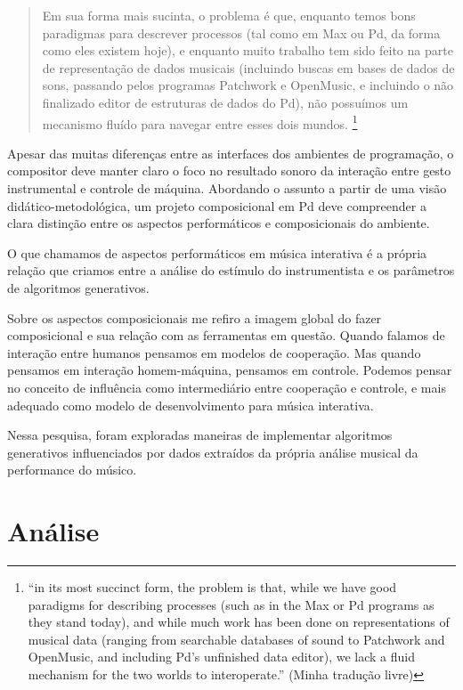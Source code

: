 \documentclass[draft]{ppgmus}
\begin{document}
\begin{quote}
Em sua forma mais sucinta, o problema é que, enquanto temos bons
paradigmas para descrever processos (tal como em Max ou Pd, da forma como
eles existem hoje), e enquanto muito trabalho tem sido feito na parte 
de representação de dados musicais (incluindo buscas em bases de dados
de sons, passando pelos programas Patchwork e OpenMusic, e incluindo
o não finalizado editor de estruturas de dados do Pd), não possuímos
um mecanismo fluído para navegar entre esses dois mundos. \cite{puckette04:divide}
  \footnote{``in its most succinct form, the problem is that, while we have good
  paradigms for describing processes (such as in the Max or Pd
  programs as they stand today), and while much work has been done on
  representations of musical data (ranging from searchable databases
  of sound to Patchwork and OpenMusic, and including Pd's unfinished
  data editor), we lack a fluid mechanism for the two worlds to
  interoperate.'' (Minha tradução livre)} 
\end{quote}

Apesar das muitas diferenças entre
as interfaces dos ambientes de programação, 
o compositor deve manter claro o foco no resultado sonoro  da interação entre
gesto instrumental e controle de máquina.
Abordando o assunto
a partir de uma visão didático-metodológica, um projeto
composicional em Pd deve compreender a clara distinção entre os
aspectos performáticos e composicionais do ambiente. 

O que chamamos de aspectos performáticos em música interativa 
é a própria relação que criamos entre a  análise do estímulo
do instrumentista e os parâmetros de algoritmos generativos.

Sobre os aspectos composicionais me refiro a imagem global
do fazer composicional e sua relação com as ferramentas em questão.
Quando falamos de interação entre humanos pensamos em modelos
de cooperação. Mas quando pensamos em interação homem-máquina, 
pensamos em controle. Podemos pensar no conceito de influência como 
intermediário entre cooperação e controle, e mais adequado como
modelo de desenvolvimento para música interativa.

Nessa pesquisa, foram exploradas maneiras de
implementar algoritmos generativos influenciados por dados
extraídos da própria análise musical da
performance do músico.


\section{Análise}
\label{sec-analise-geral}
\end{document}

